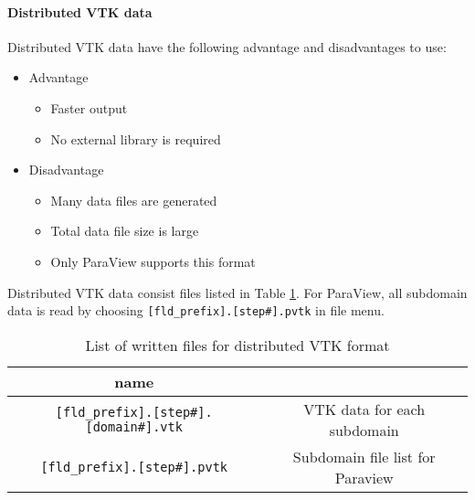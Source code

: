 \paragraph{Distributed VTK data}
Distributed VTK data have the following advantage and disadvantages to use:
%
\begin{itemize}
\item Advantage
\begin{itemize} 
\item Faster output
\item No external library is required
\end{itemize}
\item Disadvantage
\begin{itemize} 
\item Many data files are generated
\item Total data file size is large
\item Only ParaView supports this format
\end{itemize}
\end{itemize}
%
Distributed VTK data consist files listed in Table \ref{table:parallel_vtk}. For ParaView, all subdomain data is read by choosing \verb|[fld_prefix].[step#].pvtk| in file menu.
%
\begin{table}[htp]
\caption{List of written files for distributed VTK format}
\begin{center} 
\begin{tabular}{|c|c|}
\hline
 name &  \\ \hline \hline
\verb|[fld_prefix].[step#].[domain#].vtk|  & VTK data for each subdomain  \\ \hline
\verb|[fld_prefix].[step#].pvtk| & Subdomain file list for Paraview  \\ \hline
\end{tabular}
\end{center}
\label{table:parallel_vtk}
\end{table}
%

